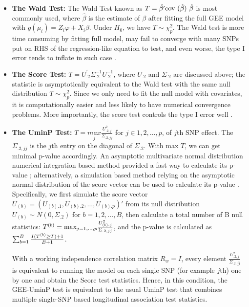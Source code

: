\documentclass[12pt]{article}
\begin{document}
\begin{itemize}
\item \textbf{The Wald Test:} The Wald Test known as $T=\hat{\beta'}\text{cov (\ensuremath{\hat{\beta}}) }\hat{\beta}$ is most commonly used, where $\hat{\beta}$ is the estimate of $\beta$ after fitting the full GEE model with $g(\mu_i) = Z_i\varphi + X_i \beta$. Under $H_0$, we have $T \sim \chi_{p}^2$. The Wald test is more time consuming by fitting full model, may fail to converge with many SNPs put on RHS of the regression-like equation to test, and even worse, the type I error tends to inflate in such case \cite{pan2014powerful,zhang2014testing}.
\item \textbf{The Score Test:} $T=U_{.2}^{'}\Sigma_{.2}^{-1}U_{.2}^{-1}$, where $U_{.2}$ and $\Sigma_{.2}$ are discussed above; the statistic is asymptotically equivalent to the Wald test with the same null distribution $T \sim \chi_{p}^2$. Since we only need to fit the null model with covariates, it is computationally easier and less likely to have numerical convergence
problems. More importantly, the score test controls the type I error well \cite{pan2014powerful,zhang2014testing}.
\item \textbf{The UminP Test: }$T=\underset{j}{max}\frac{U_{.2,j}^{2}}{\Sigma_{.2,jj}}$
for $j\in 1,2,\dots,p$, of $j$th SNP effect. The $\Sigma_{.2,jj}$ is the $j$th entry on the diagonal of $\Sigma_{.2}$. With max $T$, we can get minimal p-value accordingly. An asymptotic multivariate normal distribution numerical integration based method provided a fast way to calculate its p-value \cite{Pan2009a,Pan2009}; alternatively, a simulation based method relying on the asymptotic normal distribution of the score vector can be used to calculate its p-value \cite{pan2014powerful,zhang2014testing}. Specifically, we first simulate the score vector $U_{(b)} = ( U_{(b).1}, U_{(b).2},\ldots, U_{(b).p} )'$ from its null distribution  $U_{(b)} \sim N(0, \Sigma_{.2} )$ for $b = 1, 2, \ldots, B$, then calculate a total number of B null statistics: $T^{(b)} = \textrm{max}_{j = 1,\ldots,p} { U^2_{(b).j} \over  \Sigma_{.2,jj} }$, and the p-value is calculated as $\sum_{b=1}^B { I(T^{(b)} \geq T ) + 1  \over B + 1 } $.

With a working independence correlation matrix $R_w = I$, every element $\frac{U_{.2,j}^{2}}{\Sigma_{.2,jj}}$ is equivalent to running the model on each single SNP (for example $j$th) one by one and obtain the Score test statistics. Hence, in this condition, the GEE-UminP test is equivalent to the usual UminP test that combines multiple single-SNP based longitudinal association test statistics.
\end{itemize}
\end{document}
